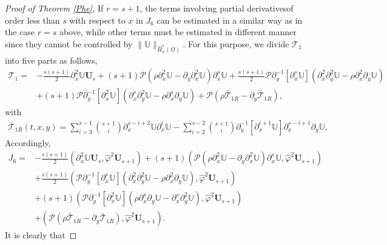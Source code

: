 \documentclass[10pt,a4paper]{amsart}
\begin{document}
\begin{proof}[Proof of Theorem \ref{Phe}]
If $r=s+1$, the terms involving partial derivativesof order less than $s$ with respect to $x$ in $J_{6}$ can be estimated in a similar way as in the case $r=s$ above, while other terms must be estimated in different manner since they cannot be controlled by $\|\mathbb{U}\|_{\hat{H}_{\psi}^{s}(\Omega)}$. For this purpose, we divide $\mathcal{T}_{1}$ into five parts as follows,
\begin{align*}
\mathcal{T}_{1}
=&-\frac{s(s+1)}{2}\partial_{x}^{2}\mathbb{U}\mathbf{U}_{s}
  +(s+1)\mathcal{P}\left(\rho\partial_{x}^{2}\mathbb{U}-\partial_{y}\partial_{x}^{2}\mathbb{U}\right)\partial_{x}^{s}\mathbb{U}
  +\frac{s(s+1)}{2}\mathcal{P}\partial_{y}^{-1}[\partial_{x}^{s}\mathbb{U}](\partial_{x}^{2}\partial_{y}^{2}\mathbb{U}-\rho\partial_{x}^{2}\partial_{y}\mathbb{U})\\
 &+(s+1)\mathcal{P}\partial_{y}^{-1}[\partial_{x}^{2}\mathbb{U}](\partial_{x}^{s}\partial_{y}^{2}\mathbb{U}-\rho\partial_{x}^{s}\partial_{y}\mathbb{U})
  +\mathcal{P}(\rho\bar{\mathcal{T}}_{1R}-\partial_{y}\bar{\mathcal{T}}_{1R}),
\end{align*}
with
\begin{align*}
\bar{\mathcal{T}}_{1R}(t,x,y)=
 \sum_{i=3}^{s-1}\binom{s+1}{i}\partial_{x}^{s-i+2}\mathbb{U}\partial_{x}^{i}\mathbb{U}
-\sum_{i=2}^{s-2}\binom{s+1}{i}\partial_{y}^{-1}[\partial_{x}^{i+1}\mathbb{U}]\partial_{x}^{s-i+1}\partial_{y}\mathbb{U}.
\end{align*}
Accordingly,
\begin{align}\label{J6}
J_{6}
=&-\frac{s(s+1)}{2}\left(\partial_{x}^{2}\mathbb{U}\mathbf{U}_{s},\hat{\varphi}^{2}\mathbf{U}_{s+1}\right)
  +(s+1)\left(\mathcal{P}\left(\rho\partial_{x}^{2}\mathbb{U}-\partial_{y}\partial_{x}^{2}\mathbb{U}\right)\partial_{x}^{s}\mathbb{U},\hat{\varphi}^{2}\mathbf{U}_{s+1}\right)\\
 &+\frac{s(s+1)}{2}\left(\mathcal{P}\partial_{y}^{-1}[\partial_{x}^{s}\mathbb{U}](\partial_{x}^{2}\partial_{y}^{2}\mathbb{U}-\rho\partial_{x}^{2}\partial_{y}\mathbb{U}),\hat{\varphi}^{2}\mathbf{U}_{s+1}\right)\nonumber\\
 &+(s+1)\left(\mathcal{P}\partial_{y}^{-1}[\partial_{x}^{2}\mathbb{U}](\rho\partial_{x}^{s}\partial_{y}\mathbb{U}-\partial_{x}^{s}\partial_{y}^{2}\mathbb{U}),\hat{\varphi}^{2}\mathbf{U}_{s+1}\right)\nonumber\\
 &+\left(\mathcal{P}(\rho\bar{\mathcal{T}}_{1R}-\partial_{y}\bar{\mathcal{T}}_{1R}),\hat{\varphi}^{2}\mathbf{U}_{s+1}\right).\nonumber
\end{align}
It is clearly that

\end{proof}
\end{document}
